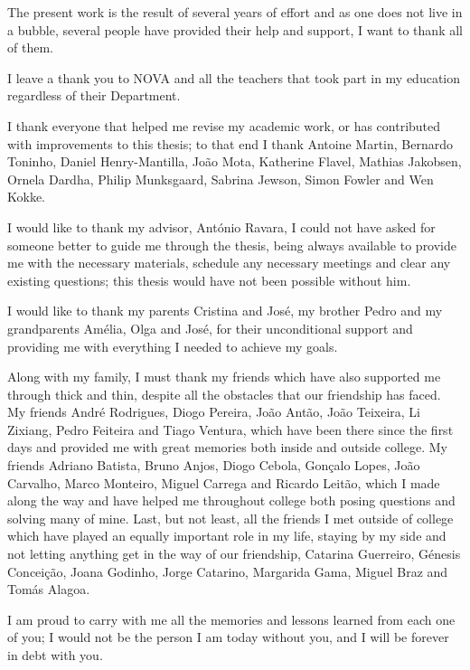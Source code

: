 

\begin{ntacknowledgements}

The present work is the result of several years of effort and as one does not live in a bubble,
several people have provided their help and support, I want to thank all of them.

I leave a thank you to NOVA and all the teachers that took part in my education regardless of their Department.

I thank everyone that helped me revise my academic work, or has contributed with improvements to this thesis;
to that end I thank Antoine Martin, Bernardo Toninho, Daniel Henry-Mantilla, João Mota,
Katherine Flavel, Mathias Jakobsen, Ornela Dardha, Philip Munksgaard, Sabrina Jewson, Simon Fowler and Wen Kokke.

I would like to thank my advisor, António Ravara,
I could not have asked for someone better to guide me through the thesis,
being always available to provide me with the necessary materials,
schedule any necessary meetings and clear any existing questions;
this thesis would have not been possible without him.

I would like to thank my parents Cristina and José, my brother Pedro and my grandparents Amélia, Olga and José,
for their unconditional support and providing me with everything I needed to achieve my goals.

Along with my family, I must thank my friends which have also supported me through thick and thin,
despite all the obstacles that our friendship has faced.
My friends André Rodrigues, Diogo Pereira, João Antão, João Teixeira, Li Zixiang, Pedro Feiteira and Tiago Ventura,
which have been there since the first days and provided me with great memories both inside and outside college.
My friends Adriano Batista, Bruno Anjos, Diogo Cebola, Gonçalo Lopes, João Carvalho, Marco Monteiro, Miguel Carrega and Ricardo Leitão,
which I made along the way and have helped me throughout college both posing questions and solving many of mine.
Last, but not least, all the friends I met outside of college which have played an equally important role in my life,
staying by my side and not letting anything get in the way of our friendship,
Catarina Guerreiro, Génesis Conceição, Joana Godinho, Jorge Catarino, Margarida Gama, Miguel Braz and Tomás Alagoa.

I am proud to carry with me all the memories and lessons learned from each one of you;
I would not be the person I am today without you, and I will be forever in debt with you.

\end{ntacknowledgements}